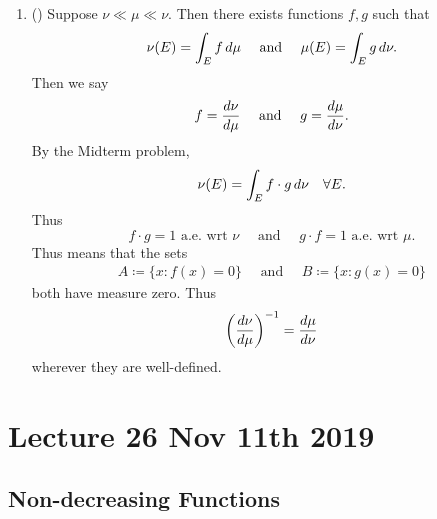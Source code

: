 \documentclass[notoc,notitlepage]{tufte-book}
\begin{document}
\begin{note}
\begin{enumerate}
    \item ()
      Suppose $\nu \ll \mu \ll \nu$.
      Then there exists functions $f, g$ such that
      \begin{equation*}
        \nu(E) = \int_{E} f \mathop{}\!d{\mu} \quad\text{ and }\quad
        \mu(E) = \int_{E} g \mathop{}\!d{\nu}.
      \end{equation*}
      Then we say
      \begin{equation*}
        f = \frac{\mathop{}\!d{\nu}}{\mathop{}\!d{\mu}} \quad\text{ and }\quad
        g = \frac{\mathop{}\!d{\mu}}{\mathop{}\!d{\nu}}.
      \end{equation*}
      By the Midterm problem, 
      \begin{equation*}
        \nu(E) = \int_{E} f \cdot g \mathop{}\!d{\nu} \quad \forall E.
      \end{equation*}
      Thus
      \begin{equation*}
        f \cdot g = 1 \text{ a.e. wrt } \nu \quad\text{ and }\quad
        g \cdot f = 1 \text{ a.e. wrt } \mu.
      \end{equation*}
      Thus means that the sets
      \begin{gather*}
        A \coloneqq \{ x : f(x) = 0 \} \quad\text{ and }\quad
        B \coloneqq \{ x : g(x) = 0 \}
      \end{gather*}
      both have measure zero.
      Thus
      \begin{equation*}
        \left( \frac{\mathop{}\!d{\nu}}{\mathop{}\!d{\mu}} \right)^{-1} = \frac{\mathop{}\!d{\mu}}{\mathop{}\!d{\nu}}
      \end{equation*}
      wherever they are well-defined.
  \end{enumerate}
\end{note}



\chapter{Lecture 26 Nov 11th 2019}%
\label{chp:lecture_26_nov_11th_2019}

\section{Non-decreasing Functions}%
\label{sec:non_decreasing_functions}
\end{document}

